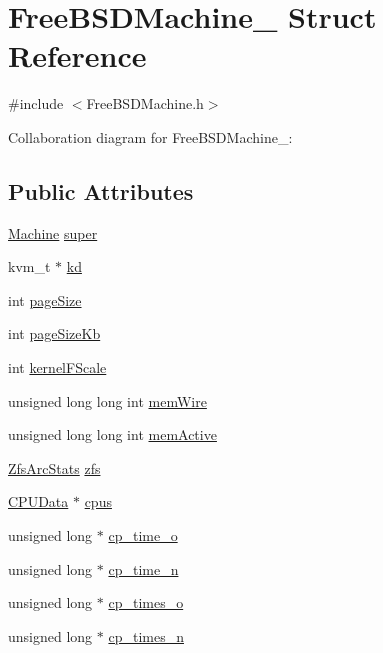 \hypertarget{structFreeBSDMachine__}{}\section{Free\+B\+S\+D\+Machine\+\_\+ Struct Reference}
\label{structFreeBSDMachine__}


{\ttfamily \#include $<$Free\+B\+S\+D\+Machine.\+h$>$}



Collaboration diagram for Free\+B\+S\+D\+Machine\+\_\+\+:
\subsection*{Public Attributes}
\begin{DoxyCompactItemize}
\item 
\hyperlink{Machine_8h_aa3706f95e4706b9d02979efcabb1341d}{Machine} \hyperlink{structFreeBSDMachine___a8131546e8917183733c4996e1be10b87}{super}
\item 
kvm\+\_\+t $\ast$ \hyperlink{structFreeBSDMachine___a2113bdd89b07dc0bf368039f9ea2df9e}{kd}
\item 
int \hyperlink{structFreeBSDMachine___a5bbca40ccf16463b57c5288294a0d086}{page\+Size}
\item 
int \hyperlink{structFreeBSDMachine___a981092f341ce332991df57ce3e54aebc}{page\+Size\+Kb}
\item 
int \hyperlink{structFreeBSDMachine___a56ec4b573fe1e11ec044ab5acd7f0f71}{kernel\+F\+Scale}
\item 
unsigned long long int \hyperlink{structFreeBSDMachine___a15fb0c62d6f2abd526bdae532425e71f}{mem\+Wire}
\item 
unsigned long long int \hyperlink{structFreeBSDMachine___a649ec00f9bcd2fd77179e3f362db575c}{mem\+Active}
\item 
\hyperlink{ZfsArcStats_8h_a2adeccbbba50329f61d34f355e5faddc}{Zfs\+Arc\+Stats} \hyperlink{structFreeBSDMachine___a32efe234d03f0515e1a5bd9b72a93c28}{zfs}
\item 
\hyperlink{DragonFlyBSDMachine_8h_a144f55b34d84d75d470d730435fef363}{C\+P\+U\+Data} $\ast$ \hyperlink{structFreeBSDMachine___a29d844651fe00ebabd0ed7e768799df7}{cpus}
\item 
unsigned long $\ast$ \hyperlink{structFreeBSDMachine___adf9ea2009fff8597eb466f0b8f13510d}{cp\+\_\+time\+\_\+o}
\item 
unsigned long $\ast$ \hyperlink{structFreeBSDMachine___a19de2cf5b89d148c64d7b3d3e1c9df18}{cp\+\_\+time\+\_\+n}
\item 
unsigned long $\ast$ \hyperlink{structFreeBSDMachine___a2484be24508ac3db0c7b1ae3bb362a84}{cp\+\_\+times\+\_\+o}
\item 
unsigned long $\ast$ \hyperlink{structFreeBSDMachine___a33c7aec068453a7bcbf0a7a1ea3a02b4}{cp\+\_\+times\+\_\+n}
\end{DoxyCompactItemize}


